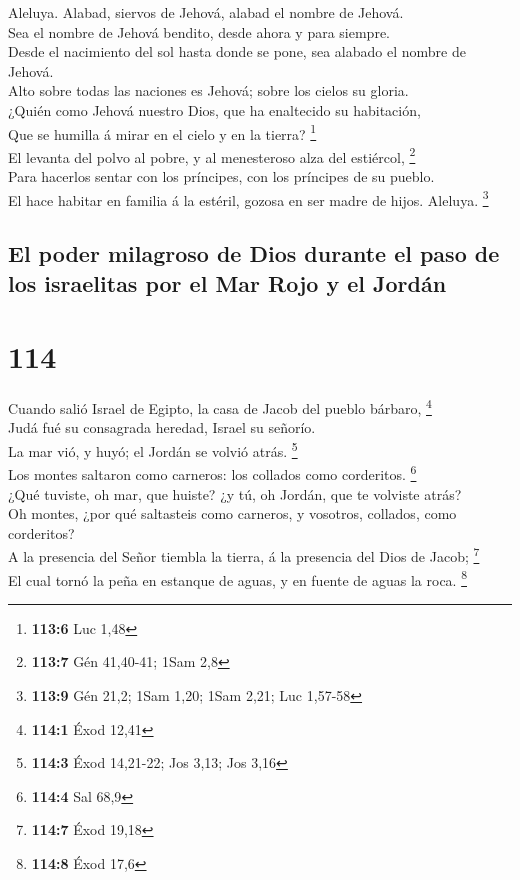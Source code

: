  Aleluya. Alabad, siervos de Jehová, alabad el nombre de
Jehová.\\
 Sea el nombre de Jehová bendito, desde ahora y para
siempre.\\
 Desde el nacimiento del sol hasta donde se pone, sea
alabado el nombre de Jehová.\\
 Alto sobre todas las naciones es Jehová; sobre los cielos
su gloria.\\
 ¿Quién como Jehová nuestro Dios, que ha enaltecido su
habitación,\\
 Que se humilla á mirar en el cielo y en la tierra?
\footnote{\textbf{113:6} Luc 1,48}\\
 El levanta del polvo al pobre, y al menesteroso alza del
estiércol, \footnote{\textbf{113:7} Gén 41,40-41; 1Sam 2,8}\\
 Para hacerlos sentar con los príncipes, con los príncipes
de su pueblo.\\
 El hace habitar en familia á la estéril, gozosa en ser
madre de hijos. Aleluya. \footnote{\textbf{113:9} Gén 21,2; 1Sam 1,20;
  1Sam 2,21; Luc 1,57-58}

\hypertarget{el-poder-milagroso-de-dios-durante-el-paso-de-los-israelitas-por-el-mar-rojo-y-el-jorduxe1n}{%
\subsection{El poder milagroso de Dios durante el paso de los israelitas
por el Mar Rojo y el
Jordán}\label{el-poder-milagroso-de-dios-durante-el-paso-de-los-israelitas-por-el-mar-rojo-y-el-jorduxe1n}}

\hypertarget{section-113}{%
\section{114}\label{section-113}}

 Cuando salió Israel de Egipto, la casa de Jacob del pueblo
bárbaro, \footnote{\textbf{114:1} Éxod 12,41}\\
 Judá fué su consagrada heredad, Israel su señorío.\\
 La mar vió, y huyó; el Jordán se volvió atrás.
\footnote{\textbf{114:3} Éxod 14,21-22; Jos 3,13; Jos 3,16}\\
 Los montes saltaron como carneros: los collados como
corderitos. \footnote{\textbf{114:4} Sal 68,9}\\
 ¿Qué tuviste, oh mar, que huiste? ¿y tú, oh Jordán, que te
volviste atrás?\\
 Oh montes, ¿por qué saltasteis como carneros, y vosotros,
collados, como corderitos?\\
 A la presencia del Señor tiembla la tierra, á la presencia
del Dios de Jacob; \footnote{\textbf{114:7} Éxod 19,18}\\
 El cual tornó la peña en estanque de aguas, y en fuente de
aguas la roca. \footnote{\textbf{114:8} Éxod 17,6}

